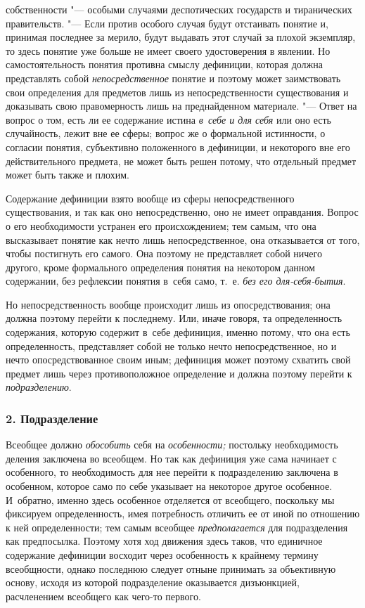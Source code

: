 собственности "--- особыми случаями деспотических государств и
тиранических правительств. "--- Если против особого случая
будут отстаивать понятие и, принимая последнее за мерило, будут выдавать
этот случай за плохой экземпляр, то здесь понятие уже больше не имеет
своего удостоверения в явлении. Но самостоятельность понятия противна
смыслу дефиниции, которая должна представлять собой
{\em непосредственное}
понятие и поэтому может заимствовать свои определения для
предметов лишь из непосредственности существования и доказывать свою
правомерность лишь на преднайденном материале. "--- Ответ на
вопрос о том, есть ли ее содержание истина
{\em в~себе и для себя}
или оно есть случайность, лежит вне ее сферы; вопрос же о
формальной истинности, о согласии понятия, субъективно положенного в
дефиниции, и некоторого вне его действительного предмета, не может быть
решен потому, что отдельный предмет может быть также и плохим.

Содержание дефиниции взято вообще из сферы непосредственного
существования, и так как оно непосредственно, оно не имеет оправдания.
Вопрос о его необходимости устранен его происхождением; тем самым, что она
высказывает понятие как нечто лишь непосредственное, она отказывается от
того, чтобы постигнуть его самого. Она поэтому не представляет собой ничего
другого, кроме формального определения понятия на некотором данном
содержании, без рефлексии понятия в~себя само, т.~е.
{\em без его для-себя-бытия}.

Но непосредственность вообще происходит лишь из
опосредствования; она должна поэтому перейти к последнему. Или,
иначе говоря, та определенность содержания, которую содержит
в~себе дефиниция, именно потому, что она есть определенность, представляет
собой не только нечто непосредственное, но и нечто опосредствованное своим
иным; дефиниция может поэтому схватить свой предмет лишь через
противоположное определение и должна поэтому перейти к
{\em подразделению}.

\subsubsection[2. Подразделение]{\bfseries 2. Подразделение}

Всеобщее должно {\em обособить} себя на {\em особенности;}
постольку необходимость деления заключена во всеобщем. Но так
как дефиниция уже сама начинает с особенного, то необходимость для нее
перейти к подразделению заключена в особенном, которое само по себе
указывает на некоторое другое особенное. И~обратно, именно здесь особенное
отделяется от всеобщего, поскольку мы фиксируем определенность, имея
потребность отличить ее от иной по отношению к ней определенности; тем
самым всеобщее {\em предполагается}
для подразделения как предпосылка. Поэтому хотя ход движения
здесь таков, что единичное содержание дефиниции восходит через особенность
к крайнему термину всеобщности, однако последнюю следует отныне принимать
за объективную основу, исходя из которой подразделение оказывается
дизъюнкцией, расчленением всеобщего как чего-то первого.

